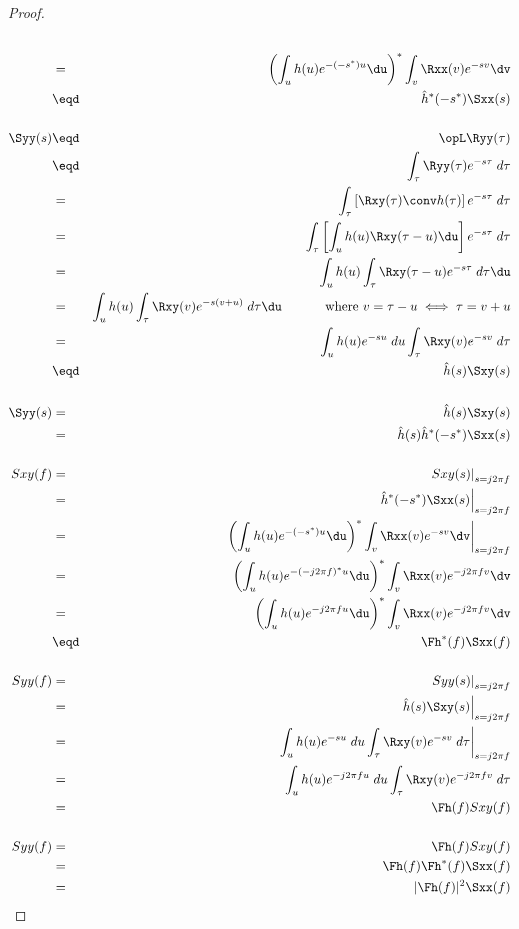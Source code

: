 \begin{proof}
\begin{eqnarray*}
   \\&=&    \left(\int_u h(u) e^{-(-s^\ast)u} \du \right)^\ast
            \int_v \Rxx(v)e^{-sv} \dv
   \\&\eqd& \hat{h}^\ast(-s^\ast) \Sxx(s)
\\
\\
   \Syy(s)
     &\eqd& \opL \Ryy(\tau)
   \\&\eqd& \int_\tau \Ryy(\tau) e^{-s\tau} \; d\tau
   \\&=&    \int_\tau \left[ \Rxy(\tau) \conv h(\tau) \right] e^{-s\tau} \; d\tau
   \\&=&    \int_\tau \left[ \int_u h(u) \Rxy(\tau-u)\du \right] e^{-s\tau} \; d\tau
   \\&=&    \int_u h(u) \int_\tau \Rxy(\tau-u) e^{-s\tau} \; d\tau\du
   \\&=&    \int_u h(u) \int_\tau \Rxy(v) e^{-s(v+u)} \; d\tau\du
            \hspace{3em}\mbox{ where $v=\tau-u\iff \tau=v+u$}
   \\&=&    \int_u h(u)e^{-su} \;du \int_\tau \Rxy(v) e^{-sv} \; d\tau
   \\&\eqd& \hat{h}(s) \Sxy(s)
\\
\\
   \Syy(s)
     &=& \hat{h}(s) \Sxy(s)
   \\&=& \hat{h}(s) \hat{h}^\ast(-s^\ast) \Sxx(s)
\\
\\
   Sxy(f)
     &=&    \left. Sxy(s)\right|_{s=j2\pi f}
   \\&=&    \left. \hat{h}^\ast(-s^\ast) \Sxx(s)\right|_{s=j2\pi f}
   \\&=&    \left.
            \left(\int_u h(u) e^{-(-s^\ast)u} \du \right)^\ast
            \int_v \Rxx(v)e^{-sv} \dv
            \right|_{s=j2\pi f}
   \\&=&    \left(\int_u h(u) e^{-(-j2\pi f)^\ast u} \du \right)^\ast
            \int_v \Rxx(v)e^{-j2\pi fv} \dv
   \\&=&    \left(\int_u h(u) e^{-j2\pi f u} \du \right)^\ast
            \int_v \Rxx(v)e^{-j2\pi fv} \dv
   \\&\eqd& \Fh^\ast(f) \Sxx(f)
\\
\\
   Syy(f)
     &=&    \left. Syy(s)\right|_{s=j2\pi f}
   \\&=&    \left. \hat{h}(s) \Sxy(s) \right|_{s=j2\pi f}
   \\&=&    \left. \int_u h(u)e^{-su} \;du \int_\tau \Rxy(v) e^{-sv} \; d\tau\right|_{s=j2\pi f}
   \\&=&    \int_u h(u)e^{-j2\pi fu} \;du \int_\tau \Rxy(v) e^{-j2\pi fv} \; d\tau
   \\&=&    \Fh(f) Sxy(f)
\\
\\
   Syy(f)
     &=&    \Fh(f) Sxy(f)
   \\&=&    \Fh(f) \Fh^\ast(f) \Sxx(f)
   \\&=&    |\Fh(f)|^2 \Sxx(f)
\end{eqnarray*}


\end{proof}

